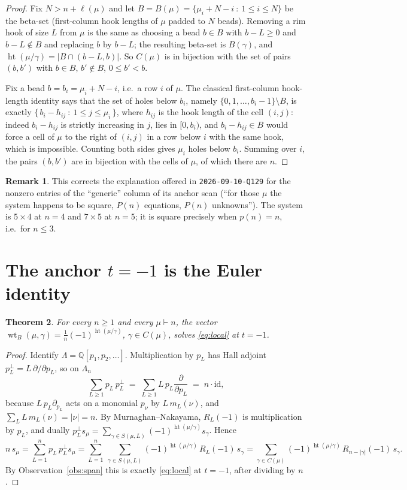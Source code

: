 \documentclass[11pt]{article}
\newtheorem{theorem}{Theorem}[section]
\theoremstyle{definition}
\newtheorem{remark}[theorem]{Remark}
\newcommand{\Q}{\mathbb{Q}}
\newcommand{\hgt}{\operatorname{ht}}      %
\newcommand{\wtB}{\operatorname{wt}_B}
\newcommand{\Lam}{\Lambda}
\begin{document}
\begin{proof}
Fix $N>n+\ell(\mu)$ and let $B=B(\mu)=\{\mu_i+N-i\ :\ 1\le i\le N\}$ be the beta-set
(first-column hook lengths of $\mu$ padded to $N$ beads). Removing a rim hook of size $L$ from
$\mu$ is the same as choosing a bead $b\in B$ with $b-L\ge0$ and $b-L\notin B$ and replacing
$b$ by $b-L$; the resulting beta-set is $B(\gamma)$, and $\hgt(\mu/\gamma)=|B\cap(b-L,b)|$.
So $C(\mu)$ is in bijection with the set of pairs $(b,b')$ with $b\in B$, $b'\notin B$,
$0\le b'<b$.

Fix a bead $b=b_i=\mu_i+N-i$, i.e.\ a row $i$ of $\mu$. The classical first-column
hook-length identity says that the set of holes below $b_i$, namely
$\{0,1,\dots,b_i-1\}\setminus B$, is exactly $\{\,b_i-h_{ij}\ :\ 1\le j\le\mu_i\,\}$, where
$h_{ij}$ is the hook length of the cell $(i,j)$: indeed $b_i-h_{ij}$ is strictly increasing
in $j$, lies in $[0,b_i)$, and $b_i-h_{ij}\in B$ would force a cell of $\mu$ to the
right of $(i,j)$ in a row below $i$ with the same hook, which is impossible. Counting both
sides gives $\mu_i$ holes below $b_i$. Summing over $i$, the pairs $(b,b')$ are in bijection
with the cells of $\mu$, of which there are $n$.
\end{proof}

\begin{remark}
This corrects the explanation offered in \texttt{2026-09-10-Q129} for the nonzero entries of
the ``generic'' column of its anchor scan (``for those $\mu$ the system happens to be square,
$P(n)$ equations, $P(n)$ unknowns''). The system is $5\times4$ at $n=4$ and $7\times5$ at
$n=5$; it is square precisely when $p(n)=n$, i.e.\ for $n\le3$.
\end{remark}

\section{The anchor $t=-1$ is the Euler identity}\label{sec:euler}

\begin{theorem}\label{thm:euler}
For every $n\ge1$ and every $\mu\vdash n$, the vector
$\wtB(\mu,\gamma)=\tfrac1n(-1)^{\hgt(\mu/\gamma)}$, $\gamma\in C(\mu)$, solves
\eqref{eq:local} at $t=-1$.
\end{theorem}

\begin{proof}
Identify $\Lam=\Q[p_1,p_2,\dots]$. Multiplication by $p_L$ has Hall adjoint
$p_L^{\perp}=L\,\partial/\partial p_L$, so on $\Lam_n$
\[
  \sum_{L\ge1}p_L\,p_L^{\perp}\;=\;\sum_{L\ge1}L\,p_L\frac{\partial}{\partial p_L}
  \;=\;n\cdot\mathrm{id},
\]
because $L\,p_L\partial_{p_L}$ acts on a monomial $p_\nu$ by $L\,m_L(\nu)$, and
$\sum_L L\,m_L(\nu)=|\nu|=n$. By Murnaghan--Nakayama,
$R_L(-1)$ is multiplication by $p_L$, and dually
$p_L^{\perp}s_\mu=\sum_{\gamma\in S(\mu,L)}(-1)^{\hgt(\mu/\gamma)}s_\gamma$. Hence
\[
  n\,s_\mu=\sum_{L=1}^{n}p_L\,p_L^{\perp}s_\mu
        =\sum_{L=1}^{n}\ \sum_{\gamma\in S(\mu,L)}(-1)^{\hgt(\mu/\gamma)}\,R_L(-1)\,s_\gamma
        =\sum_{\gamma\in C(\mu)}(-1)^{\hgt(\mu/\gamma)}\,R_{n-|\gamma|}(-1)\,s_\gamma .
\]
By Observation~\ref{obs:span} this is exactly \eqref{eq:local} at $t=-1$, after dividing by $n$.
\end{proof}
\end{document}
